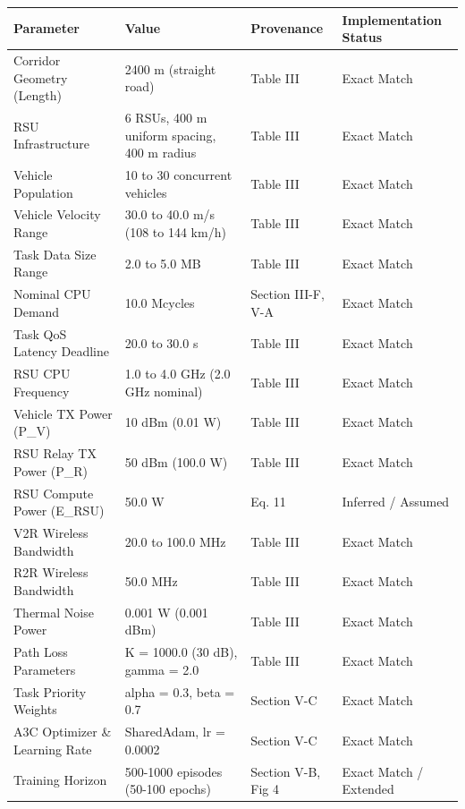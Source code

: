 \begin{tabular}{llll}
\toprule
Parameter & Value & Provenance & Implementation Status \\
\midrule
Corridor Geometry (Length) & 2400 m (straight road) & Table III & Exact Match \\
RSU Infrastructure & 6 RSUs, 400 m uniform spacing, 400 m radius & Table III & Exact Match \\
Vehicle Population & 10 to 30 concurrent vehicles & Table III & Exact Match \\
Vehicle Velocity Range & 30.0 to 40.0 m/s (108 to 144 km/h) & Table III & Exact Match \\
Task Data Size Range & 2.0 to 5.0 MB & Table III & Exact Match \\
Nominal CPU Demand & 10.0 Mcycles & Section III-F, V-A & Exact Match \\
Task QoS Latency Deadline & 20.0 to 30.0 s & Table III & Exact Match \\
RSU CPU Frequency & 1.0 to 4.0 GHz (2.0 GHz nominal) & Table III & Exact Match \\
Vehicle TX Power (P\_V) & 10 dBm (0.01 W) & Table III & Exact Match \\
RSU Relay TX Power (P\_R) & 50 dBm (100.0 W) & Table III & Exact Match \\
RSU Compute Power (E\_RSU) & 50.0 W & Eq. 11 & Inferred / Assumed \\
V2R Wireless Bandwidth & 20.0 to 100.0 MHz & Table III & Exact Match \\
R2R Wireless Bandwidth & 50.0 MHz & Table III & Exact Match \\
Thermal Noise Power & 0.001 W (0.001 dBm) & Table III & Exact Match \\
Path Loss Parameters & K = 1000.0 (30 dB), gamma = 2.0 & Table III & Exact Match \\
Task Priority Weights & alpha = 0.3, beta = 0.7 & Section V-C & Exact Match \\
A3C Optimizer \& Learning Rate & SharedAdam, lr = 0.0002 & Section V-C & Exact Match \\
Training Horizon & 500-1000 episodes (50-100 epochs) & Section V-B, Fig 4 & Exact Match / Extended \\
\bottomrule
\end{tabular}

